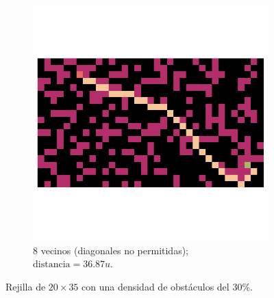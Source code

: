 \begin{enumerate}
\begin{solution}
\begin{figure}[ht!]
\begin{subfigure}{0.4\textwidth}
                \includegraphics[scale=0.3]{../figures/path_02_diag.png}
                \caption{8 vecinos (diagonales no permitidas); $\text{distancia} = 36.87 u$.}
            \end{subfigure}
            \caption{Rejilla de $20 \times 35$ con una densidad de obstáculos del $30\%$.}
            \label{fig:rejilla_20x35}
        \end{figure}


\end{solution}
\end{enumerate}
